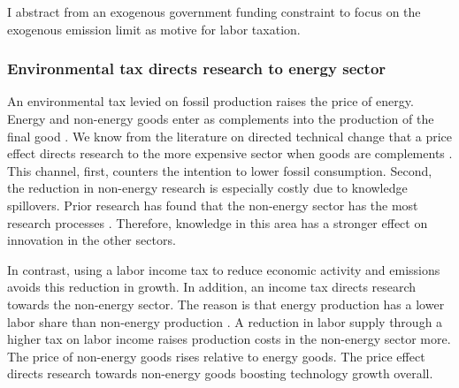 \documentclass[12pt]{article}
\begin{document}
\begin{enumerate}
I abstract from an exogenous government funding constraint to focus on the exogenous emission limit as motive for labor taxation. 
\appendix
\subsubsection*{Environmental tax directs research to energy sector}\label{sec:mec}
An environmental tax levied on fossil production raises the price of energy. Energy and non-energy goods enter as complements into the production of the final good \citep{Hassler2016EnvironmentalMacroeconomics, Fried2018ClimateAnalysis}. We know from the literature on directed technical change that a price effect  directs research to the more expensive sector when goods are complements \citep{Acemoglu2002DirectedChange, Hemous2021DirectedEconomics}.
This channel, first, counters the intention to lower fossil consumption. Second, the reduction in non-energy research is especially costly due to knowledge spillovers. Prior research has found that the non-energy sector has the most research processes \citep{Fried2018ClimateAnalysis}. Therefore, knowledge in this area has a stronger effect on innovation in the other sectors.  

In contrast, using a labor income tax to reduce economic activity and emissions avoids this reduction in growth. In addition, an income tax directs research towards the non-energy sector. The reason is that energy production has a lower labor share than non-energy production \citep{Fried2018ClimateAnalysis}. A reduction in labor supply through a higher tax on labor income raises production costs in the non-energy sector more. The price of non-energy goods rises relative to energy goods. The price effect directs research towards non-energy goods boosting technology growth overall. 
\end{enumerate}
\end{document}
